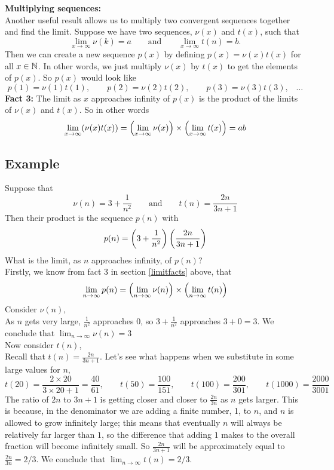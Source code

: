 \vspace{0.5cm}
\noindent \textbf{Multiplying sequences:} \\
\noindent Another useful result allows us to multiply two convergent sequences together and find the limit. Suppose we have two sequences, $\nu(x)$ and $t(x)$, such that
\[
\lim_{x \rightarrow \infty}\nu(k) = a \qquad \text{and} \qquad \lim_{x \rightarrow \infty}t(n) = b.
\]
Then we can create a new sequence $p(x)$ by defining $p(x) = \nu(x)t(x)$ for all $x \in \mathbb{N}$. In other words, we just multiply $\nu(x)$ by $t(x)$ to get the elements of $p(x)$. So $p(x)$ would look like
\[
p(1) = \nu(1)t(1), \qquad p(2) = \nu(2)t(2), \qquad p(3) = \nu(3)t(3), \;\;\; \ldots
\]
\textbf{Fact 3:} The limit as $x$ approaches infinity of $p(x)$ is the product of the limits of $\nu(x)$ and $t(x)$. So in other words
\[
\lim_{x \rightarrow \infty}(\nu(x)t(x)) = \left(\lim_{x \rightarrow \infty}\nu(x)\right)\times \left(\lim_{x \rightarrow \infty}t(x)\right) = ab
\]

\subsection{Example} \label{ex4010}
Suppose that 
\[
\nu(n) = 3 + \frac{1}{n^2} \qquad \text{and} \qquad t(n) = \frac{2n}{3n + 1}
\]
Then their product is the sequence $p(n)$ with
\[
p(n) = \left(3 + \frac{1}{n^2}\right)\left(\frac{2n}{3n + 1}\right)
\]
What is the limit, as $n$ approaches infinity, of $p(n)$? \\

\noindent Firstly, we know from fact 3 in section \ref{limitfacts} above, that
\[
\lim_{n \rightarrow \infty}p(n) = \left(\lim_{n \rightarrow \infty}\nu(n)\right)\times\left(\lim_{n \rightarrow \infty}t(n)\right)
\]
Consider $\nu(n),$ \\
As $n$ gets very large, $\frac{1}{n^2}$ approaches 0, so $3 + \frac{1}{n^2}$ approaches $3 + 0 = 3.$ We conclude that $\displaystyle{\lim_{n \rightarrow \infty}\nu(n) = 3}$ \\

\noindent Now consider $t(n)$, \\
Recall that $t(n) = \frac{2n}{3n+1}$. Let's see what happens when we substitute in some large values for $n$,
\[
t(20) = \frac{2\times20}{3\times20+1} = \frac{40}{61},\;\; \;\;\;\;\; t(50) = \frac{100}{151}, \;\;\;\;\;\;\; t(100) = \frac{200}{301}, \;\;\;\;\;\;\; t(1000) = \frac{2000}{3001}
\]
The ratio of $2n$ to $3n+1$ is getting closer and closer to $\frac{2n}{3n}$ as $n$ gets larger. This is because, in the denominator we are adding a finite number, 1, to $n$, and $n$ is allowed to grow infinitely large; this means that eventually $n$ will always be relatively far larger than $1$, so the difference that adding $1$ makes to the overall fraction will become infinitely small. 
 So $\frac{2n}{3n+1}$ will be approximately equal to $\frac{2n}{3n} = 2/3.$ We conclude that $\displaystyle{\lim_{n \rightarrow \infty}t(n) = 2/3.}$ \\
 
